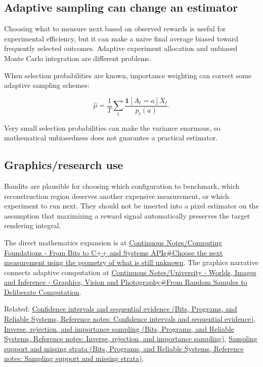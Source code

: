 \subsection{Adaptive sampling can change an estimator}\label{appendix-3dc863dbddf3-adaptive-sampling-can-change-an-estimator}

Choosing what to measure next based on observed rewards is useful for experimental efficiency, but it can make a naive final average biased toward frequently selected outcomes. Adaptive experiment allocation and unbiased Monte Carlo integration are different problems.

When selection probabilities are known, importance weighting can correct some adaptive sampling schemes:

\[
\hat\mu=
\frac1T\sum_t
\frac{\mathbf 1[A_t=a]X_t}{p_t(a)}.
\]

Very small selection probabilities can make the variance enormous, so mathematical unbiasedness does not guarantee a practical estimator.

\subsection{Graphics/research use}\label{appendix-3dc863dbddf3-graphicsresearch-use}

Bandits are plausible for choosing which configuration to benchmark, which reconstruction region deserves another expensive measurement, or which experiment to run next. They should not be inserted into a pixel estimator on the assumption that maximizing a reward signal automatically preserves the target rendering integral.

The direct mathematics expansion is at \hyperref[02-foundations-ii-ch030-choose-the-next-measurement-using-the-geometry-of-what-is-still-unknown]{Continuous Notes/Computing Foundations - From Bits to C++ and Systems APIs\#Choose the next measurement using the geometry of what is still unknown}. The graphics narrative connects adaptive computation at \hyperref[03-visual-computing-i-ch012-from-random-samples-to-deliberate-computation]{Continuous Notes/University - Worlds, Images and Inference - Graphics, Vision and Photography\#From Random Samples to Deliberate Computation}.

Related: \href{../01-Bits-Programs-and-Reliable-Systems/main.pdf\#nameddest=appendix-c83016554b1e}{Confidence intervals and sequential evidence (Bits, Programs, and Reliable Systems, Reference notes: Confidence intervals and sequential evidence)}, \href{../01-Bits-Programs-and-Reliable-Systems/main.pdf\#nameddest=appendix-8d863ed954d0}{Inverse, rejection, and importance sampling (Bits, Programs, and Reliable Systems, Reference notes: Inverse, rejection, and importance sampling)}, \href{../01-Bits-Programs-and-Reliable-Systems/main.pdf\#nameddest=appendix-10308c3d753e}{Sampling support and missing strata (Bits, Programs, and Reliable Systems, Reference notes: Sampling support and missing strata)}.
